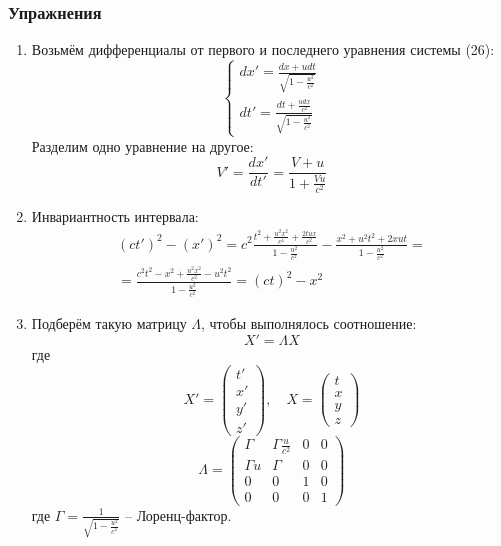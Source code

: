 \documentclass[12pt]{article}
\begin{document}
\subsubsection{Упражнения}
\begin{enumerate}
    \item Возьмём дифференциалы от первого и последнего уравнения системы (26):
    \begin{equation}
    \begin{cases}
    dx' = \frac{dx+udt}{\sqrt{1-\frac{u^2}{c^2}}}\\
    dt' = \frac{dt+\frac{udx}{c^2}}{\sqrt{1-\frac{u^2}{c^2}}}
    \end{cases}
    \end{equation}
    Разделим одно уравнение на другое:
    \begin{equation}
    V'=\frac{dx'}{dt'}=\frac{V+u}{1+\frac{Vu}{c^2}}
    \end{equation}
    \item Инвариантность интервала:
    \begin{multline}
        (ct')^2-(x')^2=c^2\frac{t^2+\frac{u^2x^2}{c^4}+\frac{2tux}{c^2}}{1-\frac{u^2}{c^2}}-\frac{x^2+u^2t^2+2xut}{1-\frac{u^2}{c^2}}=
        \\
        =\frac{c^2t^2-x^2+\frac{u^2x^2}{c^2}-u^2t^2}{1-\frac{u^2}{c^2}}=(ct)^2-x^2
    \end{multline}
    \item Подберём такую матрицу $\Lambda$, чтобы выполнялось соотношение:
    \begin{equation}
        X'=\Lambda X
    \end{equation}
    где 
    \begin{equation}
    X' = \left(
    \begin{array}{cccc}
    t'\\
    x'\\
    y'\\
    z'
\end{array}
\right),
\quad 
X = \left(
    \begin{array}{cccc}
    t\\
    x\\
    y\\
    z
\end{array}
\right)
\end{equation}
\begin{equation}
\Lambda = \left(
\begin{array}{cccc}
\Gamma & \Gamma\frac{u}{c^2} & 0 & 0\\
\Gamma u & \Gamma & 0 & 0\\
0 & 0 & 1 & 0\\
0 & 0 & 0 & 1
\end{array}
\right)
\end{equation}
где $\Gamma = \frac{1}{\sqrt{1-\frac{u^2}{c^2}}}$ -- Лоренц-фактор.
\end{enumerate}
\end{document}
